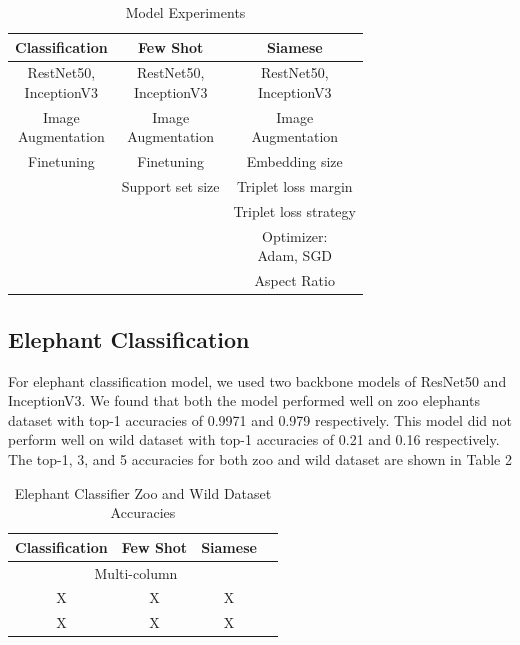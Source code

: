 \documentclass[10pt,twocolumn,letterpaper]{article}
\begin{document}
\begin{table}[h!]
  \begin{center}
    \begin{tabular}{ c | c | c} 
      \textbf{Classification} & \textbf{Few Shot} & \textbf{Siamese}\\
      \hline
      \makecell{RestNet50,  \\ InceptionV3} & \makecell{ RestNet50, \\ InceptionV3} & \makecell{RestNet50, \\ InceptionV3 }\\
       \hline
      \makecell{Image \\ Augmentation}  & \makecell{Image \\Augmentation} & \makecell{Image \\ Augmentation}\\
      \hline
      Finetuning  & Finetuning & Embedding size\\
      \hline
        & Support set size & Triplet loss margin\\
     \hline
     	& & Triplet loss strategy\\
     \hline
	& & \makecell{Optimizer: \\ Adam, SGD}\\
     \hline
      	& & Aspect Ratio\\
    \end{tabular}
  \caption{Model Experiments}
  \label{tab:table1}
  \end{center}
\end{table}

\subsection{Elephant Classification}

For elephant classification model, we used two backbone models of ResNet50 and InceptionV3. We found that both the model performed well on zoo elephants dataset with top-1 accuracies of 0.9971 and 0.979 respectively. This model did not perform well on wild dataset with top-1 accuracies of 0.21 and 0.16 respectively. The top-1, 3, and 5 accuracies for both zoo and wild dataset are shown in Table 2

\begin{table}[h!]
  \begin{center}
    \begin{tabular}{ c | c | c | c} 
    \textbf{Classification} & \textbf{Few Shot} & \textbf{Siamese}\\


    \hline
    \multicolumn{3}{c}{Multi-column}& \\
    \cline{1-3}
    X&X&X\\
    X&X&X\\
    \hline

\end{tabular}
  \caption{Elephant Classifier Zoo and Wild Dataset Accuracies}
  \label{tab:table 2}
  \end{center}
\end{table}
\end{document}
